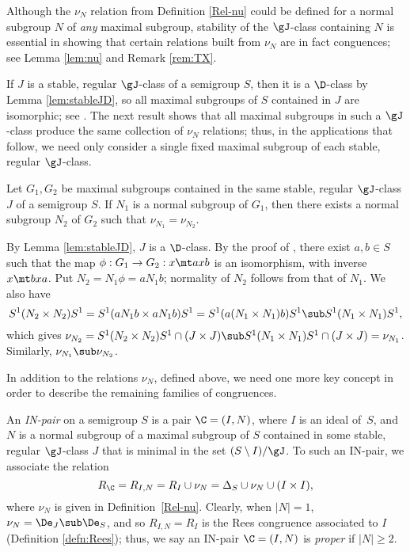 Although the $\nu_N$ relation from Definition \ref{Rel-nu} could be defined for a normal subgroup $N$ of \emph{any} maximal subgroup, stability of the $\gJ$-class containing $N$ is essential in showing that certain relations built from $\nu_N$ are in fact conguences; see Lemma \ref{lem:nu} and Remark \ref{rem:TX}.

%
If $J$ is a stable, regular $\gJ$-class of a semigroup $S$, then it is a $\D$-class by Lemma \ref{lem:stableJD}, so all maximal subgroups of $S$ contained in $J$ are isomorphic; see \cite[Proposition 2.3.6]{Howie}.  The next result shows that all maximal subgroups in such a $\gJ$-class produce the same collection of $\nu_N$ relations; thus, in the applications that follow, we need only consider a single fixed maximal subgroup of each stable, regular $\gJ$-class.

\begin{lemma}\label{lem:G1G2}
Let $G_1,G_2$ be maximal subgroups contained in the same stable, regular $\gJ$-class $J$ of a semigroup $S$.  If $N_1$ is a normal subgroup of $G_1$, then there exists a normal subgroup $N_2$ of $G_2$ such that $\nu_{N_1}=\nu_{N_2}$.
\end{lemma}

\pf
By Lemma \ref{lem:stableJD}, $J$ is a $\D$-class.
By the proof of \cite[Proposition 2.3.6]{Howie}, there exist $a,b\in S$ such that the map ${\phi:G_1\to G_2:x\mt axb}$ is an isomorphism, with inverse $x\mt bxa$.  
Put $N_2=N_1\phi=aN_1b$; normality of $N_2$ follows from that of $N_1$.  We also have
\[
S^1(N_2\times N_2)S^1 = S^1(aN_1b\times aN_1b)S^1 = S^1(a(N_1\times N_1)b)S^1 \sub S^1(N_1\times N_1)S^1,
\]
which gives $\nu_{N_2} = S^1(N_2\times N_2)S^1 \cap (J\times J) \sub S^1(N_1\times N_1)S^1 \cap (J\times J) = \nu_{N_1}$.  Similarly, $\nu_{N_1}\sub\nu_{N_2}$.
\epf

In addition to the relations $\nu_N$, defined above, we need one more key concept in order to describe the remaining families of congruences.

\begin{defn}
\label{defn:RC}
  An \emph{IN-pair} on a semigroup $S$ is a pair $\C=(I,N)$, where
  $I$ is an ideal of~$S$, and $N$ is a normal subgroup of a maximal subgroup of
  $S$ contained in some stable, regular $\gJ$-class $J$ that is minimal in the set
  $(S\setminus I)/{\gJ}$.
  To such an IN-pair, we associate the relation
  \[
  R_\C = R_{I,N} = R_I\cup\nu_N=\Delta_S \cup \nu_N \cup (I\times I),
  \]
  where $\nu_N$ is given in Definition~\ref{Rel-nu}. 
%
Clearly, when $|N|=1$, $\nu_N=\De_J\sub\De_S$, and so $R_{I,N}=R_I$ is the Rees congruence associated to $I$ (Definition \ref{defn:Rees}); thus, we say an IN-pair $\C=(I,N)$ is \emph{proper} if $|N|\geq2$.
\end{defn}


